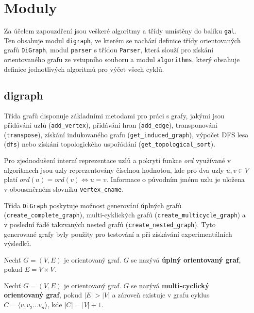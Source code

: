     \section{Moduly}
        Za účelem zapouzdření jsou veškeré algoritmy a třídy umístěny do balíku \texttt{gal}. Ten obsahuje modul \texttt{digraph}, ve kterém se nachází definice třídy orientovaných grafů \texttt{DiGraph}, modul \texttt{parser} s třídou \texttt{Parser}, která slouží pro získání orientovaného grafu ze vstupního souboru a modul \texttt{algorithms}, který obsahuje definice jednotlivých algoritmů pro výčet všech cyklů.

        \subsection{digraph}
            Třída grafů disponuje základními metodami pro práci s grafy, jakými jsou přidávání uzlů (\texttt{add\_vertex}), přidávání hran (\texttt{add\_edge}), transponování (\texttt{transpose}), získání indukovaného grafu (\texttt{get\_induced\_graph}), výpočet DFS lesa (\texttt{dfs}) nebo získání topologického uspořádání (\texttt{get\_topological\_sort}).

            Pro zjednodušení interní reprezentace uzlů a pokrytí funkce \textit{ord} využívané v algoritmech jsou uzly reprezentovány číselnou hodnotou, kde pro dva uzly $u, v \in V$ platí $ord(u) = ord(v) \iff u = v$. Informace o původním jménu uzlu je uložena v obousměrném slovníku \texttt{vertex\_cname}.

            Třída \texttt{DiGraph} poskytuje možnost generování úplných grafů (\texttt{create\_complete\_graph}), multi-cyklických grafů (\texttt{create\_multicycle\_graph}) a v poslední řadě takzvaných nested grafů (\texttt{create\_nested\_graph}). Tyto generované grafy byly použity pro testování a  při získávání experimentálních výsledků.

            \begin{definition}
                Nechť $G = (V, E)$ je orientovaný graf. $G$ se nazývá \textbf{úplný orientovaný graf}, pokud $E = V \times V$.
            \end{definition}

            \begin{definition}
                Nechť $G = (V, E)$ je orientovaný graf. $G$ se nazývá \textbf{multi-cyclický orientovaný graf}, pokud $|E| > |V|$ a zároveň existuje v grafu cyklus $C = \langle v_1v_2 \dots v_n \rangle$, kde $|C| = |V| + 1$.
            \end{definition}

